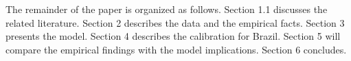 \documentclass[12pt]{article}
\newcommand{\citeonline}[1]{\citet{#1}}
\begin{document}
	The remainder of the paper is organized as follows. Section 1.1 discusses the related literature. Section 2 describes the data and the empirical facts. Section 3 presents the model. Section 4 describes the calibration for Brazil. Section 5 will compare the empirical findings with the model implications. Section 6 concludes.
	
	
	
	
	
	
	
\end{document}
